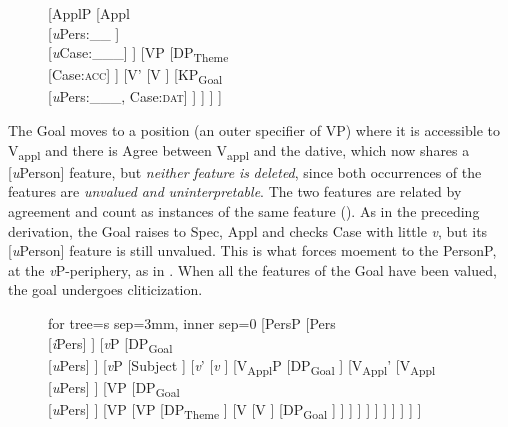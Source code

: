 \documentclass[output=paper,colorlinks,citecolor=brown,nonflat]{./langscibook}
\begin{document}
\begin{figure}%
	\begin{forest}
		[ApplP
			[Appl\\
				{[}\textit{u}Pers:\_\_ {]}\\
				{[}\textit{u}Case:\_\_\_{]}
			]
			[VP
				[DP\textsubscript{Theme} \\
				 {[}Case:\textsc{acc}{]}
				]
				[V'
					[V
					]
					[KP\textsubscript{Goal}\\{[}\textit{u}Pers:\_\_\_{,} Case:\textsc{dat}{]}
					]
				]
			]
		]	
	\end{forest}
	\caption{\label{fig:cornilescu:9} \missingcaption}
\end{figure}


The Goal moves to a position (an outer specifier of VP) where it is accessible to V\textsubscript{appl} and there is Agree between V\textsubscript{appl} and the dative, which now shares a [\textit{u}Person] feature, but \textit{neither} \textit{feature} \textit{is} \textit{deleted}, since both occurrences of the features are \textit{unvalued} \textit{and} \textit{uninterpretable}. The two features are related by agreement and count as instances of the same feature (\citealt{PesetskyTorrego2007}). As in the preceding derivation, the Goal raises to Spec, Appl and checks Case with little \textit{v}, but its [\textit{u}Person] feature is still unvalued. This is what forces moement to the PersonP, at the  \textit{v}P-periphery, as in . When all the features of the Goal have been valued, the goal undergoes cliticization.

  
 \begin{figure}%
	\begin{forest}
	for tree={s sep=3mm, inner sep=0}
		[PersP
			[Pers\\
				{[}\textit{i}Pers{]}
			]
			[\textit{v}P
				[DP\textsubscript{Goal}\\
					{[}\textit{u}Pers{]}
				]
				[\textit{v}P
					[Subject
					]
					[\textit{v}’
						[\textit{v}
						]
						[V\textsubscript{Appl}P
							[DP\textsubscript{Goal}
							]
							[V\textsubscript{Appl}'
								[V\textsubscript{Appl}\\
								 {[}\textit{u}Pers{]}
								]
								[VP
									[DP\textsubscript{Goal}\\
									 {[}\textit{u}Pers{]}
									]
									[VP
										[VP
											[DP\textsubscript{Theme}
											]
											[V
												[V
												]
												[DP\textsubscript{Goal}
												]
											]
										]
									]
								]
							]
						]
					]
				]
			]
		]	
 	\end{forest}
	\caption{\label{fig:cornilescu:10} \missingcaption}
\end{figure}
\end{document}
